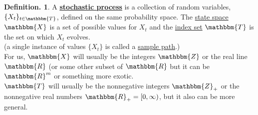 \documentclass[12pt]{article}
\theoremstyle{definition}
\newtheorem{mydef}{Definition.}[section]
\theoremstyle{plain}
\begin{document}
\begin{mydef}
A \underline{\textbf{stochastic process}} is a collection of random variables, $\{X_t\}_{t \in \mathbbm{T}}$, defined on the same probability space. The \underline{state space} $\mathbbm{X}$ is a set of possible values for $X_t$ and the \underline{index set} $\mathbbm{T}$ is the set on which $X_t$ evolves.\\
(a single instance of values $\{X_t\}$ is called a \underline{sample path}.) \\
For us, $\mathbbm{X}$ will usually be the integers $\mathbbm{Z}$ or the real line $\mathbbm{R}$ (or some other subset of $\mathbbm{R}$ but it can be $\mathbbm{R}^m$ or something more exotic. \\
$\mathbbm{T}$ will usually be the nonnegative integers $\mathbbm{Z}_+$ or the nonnegative real numbers $\mathbbm{R}_+ = [0, \infty)$, but it also can be more general. 
\end{mydef}
\end{document}
